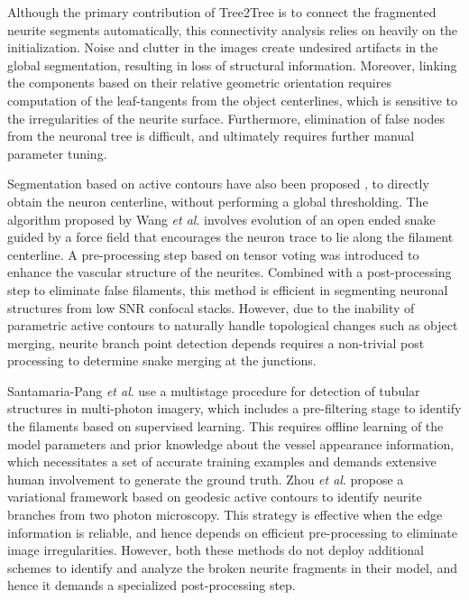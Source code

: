 Although the primary contribution of Tree2Tree is to connect the fragmented neurite segments automatically, this connectivity analysis relies on heavily on the initialization. Noise and clutter in the images create undesired artifacts in the global segmentation, resulting in loss of structural information. Moreover, linking the components based on their relative geometric orientation requires computation of the leaf-tangents from the object centerlines, which is sensitive to the irregularities of the neurite surface. Furthermore, elimination of false nodes from the neuronal tree is  difficult, and ultimately requires further manual parameter tuning.

Segmentation based on active contours \cite{kwt_snakes} have also been proposed \cite{wang_Roysam_open_curve}, \cite{cai_ISBI} to directly obtain the neuron centerline, without performing a global thresholding. The algorithm proposed by Wang \textit{et al}. \cite{wang_Roysam_open_curve}  involves evolution of an open ended snake guided by a force field that encourages the neuron trace to lie along the filament centerline. A pre-processing step based on tensor voting \cite{roysam_tensorvoting} was introduced to enhance the vascular structure of the neurites. Combined with a post-processing step to eliminate false filaments, this method is efficient in segmenting neuronal structures from low SNR confocal stacks. However, due to the inability of parametric active contours to naturally handle topological changes such as object merging, neurite branch point detection depends requires a non-trivial post processing to determine snake merging at the junctions. 

Santamaria-Pang \textit{et al}. \cite{santamaria2007automatic} use a multistage procedure for detection of tubular structures in multi-photon imagery, which includes a pre-filtering stage to identify the filaments based on supervised learning. This requires offline learning of the model parameters and prior knowledge about the vessel appearance information, which necessitates a set of accurate training examples and demands extensive human involvement to generate the ground truth. Zhou \textit{et al}. \cite{zhao_variational} propose a variational framework based on geodesic active contours to identify neurite branches from two photon microscopy. This strategy is effective when the edge information is reliable, and hence depends on efficient pre-processing to eliminate image irregularities. However, both these methods do not deploy additional schemes to identify and analyze the broken neurite fragments in their model, and hence it demands a specialized post-processing step. 
